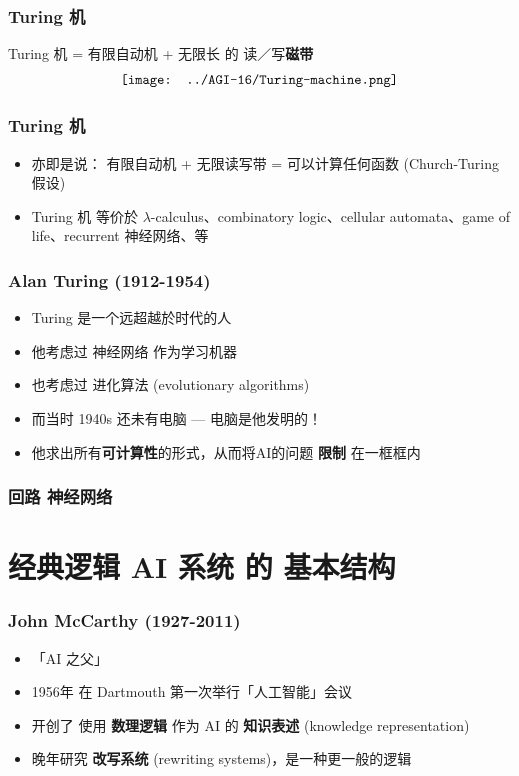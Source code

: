 \documentclass[17pt]{beamer}
\begin{document}
\begin{frame}
\frametitle{Turing 机}
	Turing 机 = 有限自动机 + 无限长 的 读／写\textbf{磁带}
	\begin{equation}
	\vcenter{\hbox{\texttt{[image: ../AGI-16/Turing-machine.png]}}}
	\end{equation}
\end{frame}

\begin{frame}
\frametitle{Turing 机}
\begin{itemize}
	\item 亦即是说： 有限自动机 + 无限读写带 = 可以计算任何函数 (Church-Turing 假设)
	\item Turing 机 等价於 $\lambda$-calculus、combinatory logic、cellular automata、game of life、recurrent 神经网络、等
\end{itemize}
\end{frame}

\begin{frame}
\frametitle{Alan Turing (1912-1954)}
\begin{itemize}
	\item Turing 是一个远超越於时代的人
	\item 他考虑过 神经网络 作为学习机器
	\item 也考虑过 进化算法 (evolutionary algorithms)
	\item 而当时 1940s 还未有电脑 --- 电脑是他发明的！
	\item {\color{red}他求出所有\textbf{可计算性}的形式，从而将AI的问题 \textbf{限制} 在一框框内} 
\end{itemize}
\end{frame}

\begin{frame}
\frametitle{回路 神经网络}

\end{frame}

\section[经典逻辑 AI 系统 的基本结构]{经典逻辑 AI 系统 的 \newline 基本结构}
\frame{\sectionpage}

\begin{frame}
\frametitle{John McCarthy (1927-2011)}
\begin{itemize}
	\item 「AI 之父」
	\item 1956年 在 Dartmouth 第一次举行「人工智能」会议
	\item 开创了 使用 \textbf{数理逻辑} 作为 AI 的 \textbf{知识表述} (knowledge representation)
	\item 晚年研究 \textbf{改写系统} (rewriting systems)，是一种更一般的逻辑
\end{itemize}
\end{frame}
\end{document}

